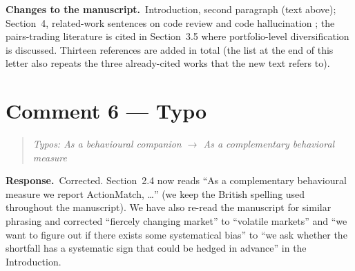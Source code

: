 \documentclass[11pt,a4paper]{article}
\newenvironment{reviewer}{\par\medskip\noindent\begin{quote}\itshape}{\end{quote}\par}
\newcommand{\response}{\par\noindent\textbf{Response.}\ }
\newcommand{\changes}{\par\medskip\noindent\textbf{Changes to the manuscript.}\ }
\begin{document}
\changes Introduction, second paragraph (text above); Section~4, related-work sentences on code review and code hallucination \citep{tian2024codehalu,zhang2024hallucode}; the pairs-trading literature \citep{gatev2006,yilmaz2026} is cited in Section~3.5 where portfolio-level diversification is discussed. Thirteen references are added in total (the list at the end of this letter also repeats the three already-cited works that the new text refers to).

\section*{Comment 6 --- Typo}
\begin{reviewer}
Typos: As a behavioural companion $\to$ As a complementary behavioral measure
\end{reviewer}

\response Corrected. Section~2.4 now reads ``As a complementary behavioural measure we report ActionMatch, \ldots'' (we keep the British spelling used throughout the manuscript). We have also re-read the manuscript for similar phrasing and corrected ``fiercely changing market'' to ``volatile markets'' and ``we want to figure out if there exists some systematical bias'' to ``we ask whether the shortfall has a systematic sign that could be hedged in advance'' in the Introduction.

\end{document}
